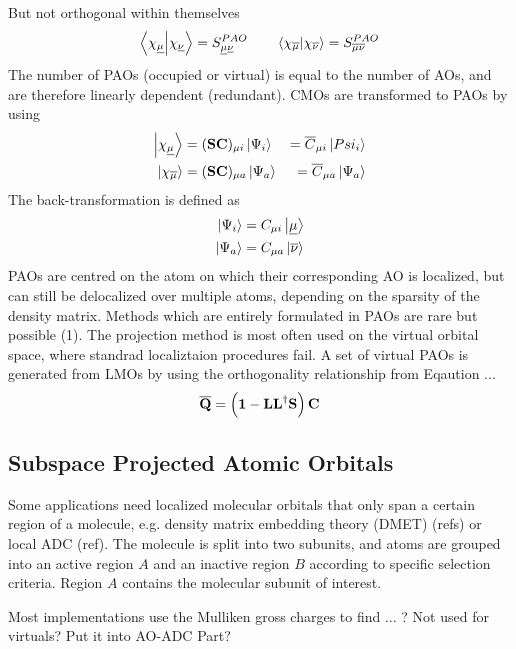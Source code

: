 \noindent But not orthogonal within themselves
\begin{equation}
\bra{\chi_{\underline{\mu}}} \ket{\chi_{\underline{\nu}}} = S^{PAO}_{\underline{\mu}\underline{\nu}} \qquad \bra{\chi_{\overline{\mu}}} \ket{\chi_{\overline{\nu}}} = S^{PAO}_{\overline{\mu}\overline{\nu}}
\end{equation}
The number of PAOs (occupied or virtual) is equal to the number of AOs, and are therefore linearly dependent (redundant). CMOs are transformed to PAOs by using
\begin{eqnarray}
\ket{\chi_{\underline{\mu}}} &= (\mathbf{SC})_{\mu i}  \ket{\Psi_i} &= \overline{C}_{\mu i} \ket{Psi_i} \\
\ket{\chi_{\overline{\mu}}} &= (\mathbf{SC})_{\mu a} \ket{\Psi_a} &=  \overline{C}_{\mu a} \ket{\Psi_a}
\label{CMO2PAO}
\end{eqnarray}
\noindent The back-transformation is defined as
\begin{eqnarray}
\ket{\Psi_{i}} &= C_{\mu i} \ket{\underline{\mu}} \\
\ket{\Psi_{a}} &= C_{\mu a} \ket{\overline{\nu}} 
\label{PAO2CMO}
\end{eqnarray}
PAOs are centred on the atom on which their corresponding AO is localized, but can still be delocalized over multiple atoms, depending on the sparsity of the density matrix. Methods which are entirely formulated in PAOs are rare but possible (1). The projection method is most often used on the virtual orbital space, where standrad localiztaion procedures fail. A set of virtual PAOs is generated from LMOs by using the orthogonality relationship from Eqaution ...
\begin{equation}
\mathbf{\overline{Q}} = \left( \mathbf{1} - \mathbf{LL}^{\dagger} \mathbf{S} \right) \mathbf{C} 
\end{equation}

\subsection{Subspace Projected Atomic Orbitals}

Some applications need localized molecular orbitals that only span a certain region of a molecule, e.g. density matrix embedding theory (DMET) (refs) or local ADC (ref). The molecule is split into two subunits, and atoms are grouped into an active region $A$ and an inactive region $B$ according to specific selection criteria. Region $A$ contains the molecular subunit of interest. 

Most implementations use the Mulliken gross charges to find
... ? Not used for virtuals? Put it into AO-ADC Part?

